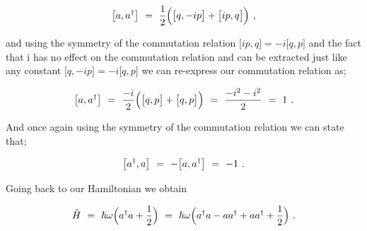 \documentclass{article}
\begin{document}
\begin{equation} \label{eb-eq-256-16}
\big[ a , a^{\dagger} \big] \hspace{0.125cm} = \hspace{0.125cm} \frac{1}{2} \Big( \big[ q , - i p \big] + \big[ i p , q \big] \Big)  \hspace{0.125cm} ,
\end{equation}

and using the symmetry of the commutation relation \begin{math} \big[ i p , q \big] = -i \big[ q , p \big] \end{math} and the fact that i has no effect on the commutation relation and can be extracted just like any constant \begin{math} \big[ q , - i p \big] = -i \big[ q , p \big] \end{math} we can re-express our commutation relation as; 

\begin{equation} \label{eb-eq-256-17}
\big[ a , a^{\dagger} \big] \hspace{0.125cm} = \hspace{0.125cm} \frac{- i}{2} \Big( \big[ q , p \big] + \big[ q , p \big] \Big) \hspace{0.125cm} = \hspace{0.125cm} \frac{- i^2 - i^2}{2}\hspace{0.125cm} = \hspace{0.125cm} 1 \hspace{0.125cm} .
\end{equation}

And once again using the symmetry of the commutation relation we can state that;

\begin{equation} \label{eb-eq-256-18}
\big[ a^{\dagger} , a \big] \hspace{0.125cm} = \hspace{0.125cm} - \big[ a , a^{\dagger} \big] \hspace{0.125cm} = \hspace{0.125cm} -1 \hspace{0.125cm} .
\end{equation}

Going back to our Hamiltonian we obtain

\begin{equation} \label{eb-eq-256-19}
\hat{H} \hspace{0.125cm} = \hspace{0.125cm} \hbar \omega \Big( a^{\dagger} a + \frac{1}{2} \Big) \hspace{0.125cm} = \hspace{0.125cm} \hbar \omega \Big( a^{\dagger} a -  a a^{\dagger} + a a^{\dagger} +\frac{1}{2} \Big) \hspace{0.125cm} .
\end{equation}
\end{document}
